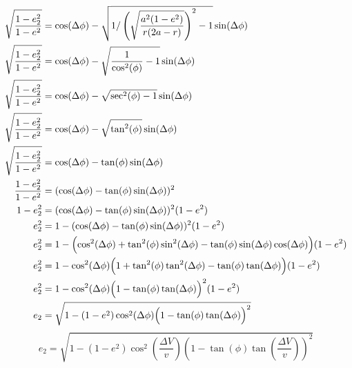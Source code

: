 \documentclass{article}
\begin{document}
\begin{align*}
    \sqrt{\frac{1-e_2^2}{1-e^2}}                                          & =\cos(\Delta \phi)-\sqrt{1/\left(\sqrt{\frac{a^2(1-e^2)}{r(2a-r)}}\right)^2-1}\sin(\Delta \phi)                         \\
    \sqrt{\frac{1-e_2^2}{1-e^2}}                                          & =\cos(\Delta \phi)-\sqrt{\frac{1}{\cos^2(\phi)}-1}\sin(\Delta \phi)                                                     \\
    \sqrt{\frac{1-e_2^2}{1-e^2}}                                          & =\cos(\Delta \phi)-\sqrt{\sec^2(\phi)-1}\sin(\Delta \phi)                                                               \\
    \sqrt{\frac{1-e_2^2}{1-e^2}}                                          & =\cos(\Delta \phi)-\sqrt{\tan^2(\phi)}\sin(\Delta \phi)                                                                 \\
    \sqrt{\frac{1-e_2^2}{1-e^2}}                                          & =\cos(\Delta \phi)-\tan(\phi)\sin(\Delta \phi)                                                                          \\
    \frac{1-e_2^2}{1-e^2}                                                 & =(\cos(\Delta \phi)-\tan(\phi)\sin(\Delta \phi))^2                                                                      \\
    1-e_2^2                                                               & =(\cos(\Delta \phi)-\tan(\phi)\sin(\Delta\phi))^2(1-e^2)                                                                \\
    e_2^2                                                                 & =1-(\cos(\Delta \phi)-\tan(\phi)\sin(\Delta\phi))^2(1-e^2)                                                              \\
    e_2^2                                                                 & =1-\Bigl(\cos^2(\Delta\phi)+\tan^2(\phi)\sin^2(\Delta\phi)-\tan(\phi)\sin(\Delta\phi)\cos(\Delta\phi)\Bigr)(1-e^2)      \\
    e_2^2                                                                 & =1-\cos^2(\Delta\phi)\Bigl(1+\tan^2(\phi)\tan^2(\Delta\phi)-\tan(\phi)\tan(\Delta\phi)\Bigr)(1-e^2)                     \\
    e_2^2                                                                 & =1-\cos^2(\Delta\phi)\Bigl(1-\tan(\phi)\tan(\Delta\phi)\Bigr)^2(1-e^2)                                                  \\
    e_2                                                                   & =\sqrt{1-(1-e^2)\cos^2(\Delta\phi)\Bigl(1-\tan(\phi)\tan(\Delta\phi)\Bigr)^2}
\end{align*}
\begin{equation*}
    e_2=\sqrt{1-(1-e^2)\cos^2\left(\frac{\Delta V}{v}\right)\left(1-\tan(\phi)\tan\left(\frac{\Delta V}{v}\right)\right)^2}
\end{equation*}
\end{document}
